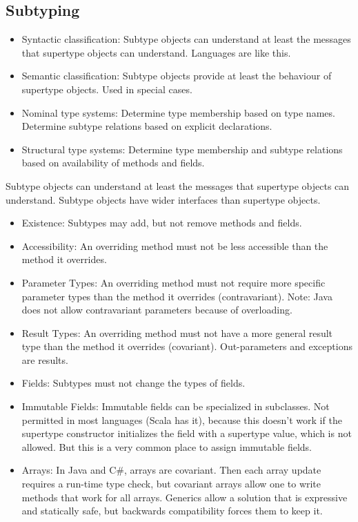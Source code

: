 \subsection{Subtyping}
\begin{mytitle}\hfill
\begin{itemize}
    \item Syntactic classification: Subtype objects can understand at least the messages that supertype objects can understand. Languages are like this.
    \item Semantic classification: Subtype objects provide at least the behaviour of supertype objects. Used in special cases.
\end{itemize}
\end{mytitle}
\begin{mytitle}\hfill
\begin{itemize}
    \item Nominal type systems: Determine type membership based on type names. Determine subtype relations based on explicit declarations. 
    \item Structural type systems: Determine type membership and subtype relations based on availability of methods and fields.
\end{itemize}
\end{mytitle}
\begin{mytitle} Subtype objects can understand at least the messages that supertype objects can understand. Subtype objects have wider interfaces than supertype objects. 
\begin{itemize}
    \item Existence: Subtypes may add, but not remove methods and fields.
    \item Accessibility: An overriding method must not be less accessible than the method it overrides.
    \item Parameter Types: An overriding method must not require more specific parameter types than the method it overrides (contravariant). Note: Java does not allow contravariant parameters because of overloading.
    \item Result Types: An overriding method must not have a more general result type than the method it overrides (covariant). Out-parameters and exceptions are results.
    \item Fields: Subtypes must not change the types of fields.
    \item Immutable Fields: Immutable fields can be specialized in subclasses. Not permitted in most languages (Scala has it), because this doesn't work if the supertype constructor initializes the field with a supertype value, which is not allowed. But this is a very common place to assign immutable fields.
    \item Arrays: In Java and C\#, arrays are covariant. Then each array update requires a run-time type check, but covariant arrays allow one to write methods that work for all arrays. Generics allow a solution that is expressive and statically safe, but backwards compatibility forces them to keep it. 
\end{itemize}
\end{mytitle}

